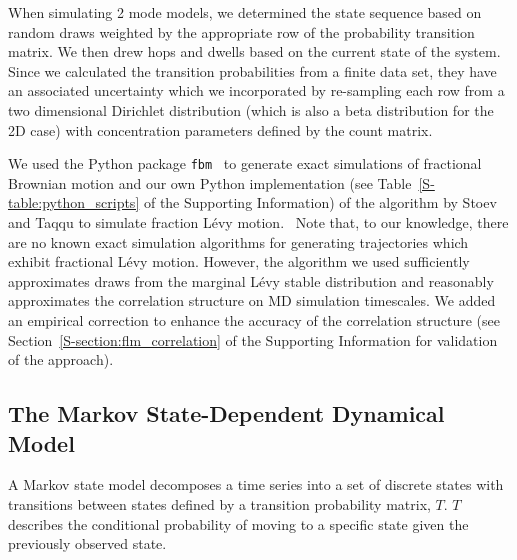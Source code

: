 \documentclass[journal=jctcce,manuscript=article]{achemso}
\begin{document}
  When simulating 2 mode models, we determined the state sequence based on
  random draws weighted by the appropriate row of the probability transition
  matrix. We then drew hops and dwells based on the current state of the
  system. Since we calculated the transition probabilities from a finite data
  set, they have an associated uncertainty which we incorporated by re-sampling
  each row from a two dimensional Dirichlet distribution (which is also a beta
  distribution for the 2D case) with concentration parameters defined by the
  count matrix.~\cite{bacallado_bayesian_2009}
  
  We used the Python package \texttt{fbm}~\cite{flynn_exact_2019} to generate exact
  simulations of fractional Brownian motion and our own Python implementation (see
  Table~\ref{S-table:python_scripts} of the Supporting Information) of the algorithm
  by Stoev and Taqqu to simulate fraction L\'evy motion.~\cite{stoev_simulation_2004}
  Note that, to our knowledge, there are no known exact simulation algorithms for 
  generating trajectories which exhibit fractional L\'evy motion.
  However, the algorithm we used sufficiently approximates draws from the
  marginal L\'evy stable distribution and reasonably approximates the
  correlation structure on MD simulation timescales. We added an empirical
  correction to enhance the accuracy of the correlation structure (see
  Section~\ref{S-section:flm_correlation} of the Supporting Information for
  validation of the approach).

  \subsection{The Markov State-Dependent Dynamical Model}\label{method:MSMs}  

  A Markov state model decomposes a time series into a set of discrete
  states with transitions between states defined by a transition probability
  matrix, $T$. $T$ describes the conditional probability of moving to a
  specific state given the previously observed
  state.~\cite{pande_everything_2010,wehmeyer_introduction_2018}
\end{document}
